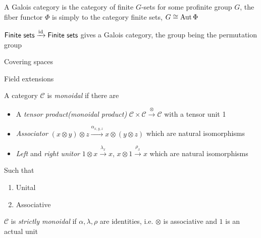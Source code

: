 \documentclass[main]{subfiles}
\begin{document}
\begin{definition}
A Galois category is the category of finite $G$-sets for some profinite group $G$, the fiber functor $\Phi$ is simply to the category finite sets, $G\cong\operatorname{Aut}\Phi$
\end{definition}

\begin{example}
$\textsf{Finite sets}\xrightarrow{\operatorname{id}}\textsf{Finite sets}$ gives a Galois category, the group being the permutation group
\end{example}

\begin{example}
Covering spaces
\end{example}

\begin{example}
Field extensions
\end{example}

\begin{definition}
A category $\mathscr C$ is \textit{monoidal} if there are
\begin{itemize}
\item A \textit{tensor product(monoidal product)} $\mathscr C\times \mathscr C\xrightarrow{\otimes}\mathscr C$ with a tensor unit 1
\item \textit{Associator} $(x\otimes y)\otimes z\xrightarrow{\alpha_{x,y,z}}x\otimes(y\otimes z)$ which are natural isomorphisms
\item \textit{Left} and \textit{right unitor} $1\otimes x\xrightarrow{\lambda_x}x$, $x\otimes 1\xrightarrow{\rho_x}x$ which are natural isomorphisms
\end{itemize}
Such that
\begin{enumerate}
\item Unital
\begin{center}
\end{center}
\item Associative
\begin{center}
\end{center}
\end{enumerate}
$\mathscr C$ is \textit{strictly monoidal} if $\alpha,\lambda,\rho$ are identities, i.e. $\otimes$ is associative and $1$ is an actual unit
\end{definition}
\end{document}
